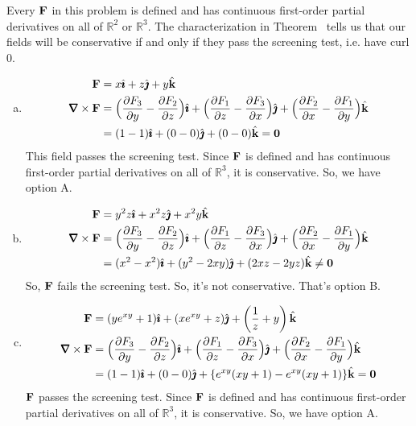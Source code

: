 \begin{solution}
Every $\mathbf{F}$ in this problem is defined and has continuous first-order partial derivatives on all of $\mathbb R^2$ or $\mathbb R^3$. The characterization in Theorem~ tells us that our fields will be conservative if and only if they pass the screening test, i.e. have curl 0.

\begin{enumerate}[a.]
\item \begin{align*}\vF&=x\hi + z\hj + y\hk\\
\vnabla \times \vF&=\Big(\frac{\partial F_3}{\partial y} -\frac{\partial F_2}{\partial z} \Big)\hi
+\Big(\frac{\partial F_1}{\partial z} -\frac{\partial F_3}{\partial x} \Big)\hj
+\Big(\frac{\partial F_2}{\partial x} -\frac{\partial F_1}{\partial y} \Big)\hk\\
&=(1-1)\hi+(0-0)\hj+(0-0)\hk = \mathbf0
\end{align*}
This field passes the screening test.  Since $\mathbf{F}$ is defined and has continuous first-order partial derivatives on all of $\mathbb R^3$, it is conservative. So, we have option A.

\item  \begin{align*}\vF&=y^2z\hi + x^2z\hj + x^2y\hk\\
\vnabla \times \vF&=\Big(\frac{\partial F_3}{\partial y} -\frac{\partial F_2}{\partial z} \Big)\hi
+\Big(\frac{\partial F_1}{\partial z} -\frac{\partial F_3}{\partial x} \Big)\hj
+\Big(\frac{\partial F_2}{\partial x} -\frac{\partial F_1}{\partial y} \Big)\hk\\
&=(x^2-x^2)\hi+(y^2-2xy)\hj+(2xz-2yz)\hk \neq \mathbf0
\end{align*}
So, $\mathbf{F}$ fails the screening test.  So, it's not conservative. That's option B.

\item 
 \begin{align*}\vF&=(ye^{xy}+1)\hi + (xe^{xy}+z)\hj + \left( \frac1z+y\right)\hk\\
\vnabla \times \vF&=\Big(\frac{\partial F_3}{\partial y} -\frac{\partial F_2}{\partial z} \Big)\hi
+\Big(\frac{\partial F_1}{\partial z} -\frac{\partial F_3}{\partial x} \Big)\hj
+\Big(\frac{\partial F_2}{\partial x} -\frac{\partial F_1}{\partial y} \Big)\hk\\
&=(1-1)\hi+(0-0)\hj+\{e^{xy}(xy+1)-e^{xy}(xy+1)\}\hk = \mathbf0
\end{align*}
$\mathbf{F}$ passes the screening test. Since $\mathbf{F}$ is defined and has continuous first-order partial derivatives on all of $\mathbb R^3$, it is conservative. So, we have option A.


\end{enumerate}
\end{solution}
